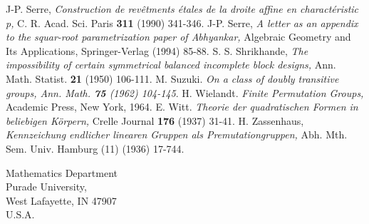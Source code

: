 \begin{thebibliography}{99}
 J-P. Serre, \textit{Construction de rev\^etments \'etales de la droite affine en charact\'eristic p,} C. R. Acad. Sci. Paris {\bf 311} (1990) 341-346.
J-P. Serre, \textit{A letter as an appendix to the squar-root parametrization paper of Abhyankar,} Algebraic Geometry and Its Applications, Springer-Verlag (1994) 85-88.
 S. S. Shrikhande, \textit{The impossibility of certain symmetrical balanced incomplete block designs,} Ann. Math. Statist. {\bf 21} (1950) 106-111.
 M. Suzuki. \textit{On a class of doubly transitive groups, Ann. Math. {\bf 75} (1962) 104-145}.
 H. Wielandt. \textit{Finite Permutation Groups,} Academic Press, New York, 1964.
 E. Witt. \textit{Theorie der quadratischen Formen in beliebigen K\"orpern,} Crelle Journal {\bf 176} (1937) 31-41.
 H. Zassenhaus, \textit{Kennzeichung endlicher linearen Gruppen als Premutationgruppen,} Abh. Mth. Sem. Univ. Hamburg {\rm (11)} (1936) 17-744.
\end{thebibliography}

\bigskip
\begin{flushleft}
Mathematics Department\\
Purade University,\\
West Lafayette, IN 47907\\
U.S.A.
\end{flushleft}
